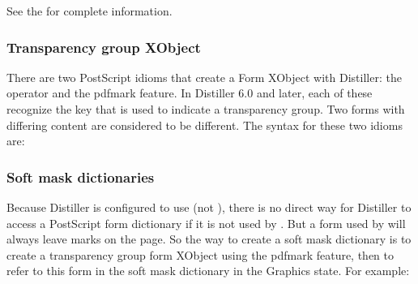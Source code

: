 \documentclass[letterpaper,12pt,english,openany,oneside]{sphinxmanual}
\begin{document}

See the  for complete information.


\subsubsection{Transparency group XObject}
\label{\detokenize{pdfmark_Basic:transparency-group-xobject}}
There are two PostScript idioms that create a Form XObject with Distiller: the  operator and the  pdfmark feature. In Distiller 6.0 and later, each of these recognize the  key that is used to indicate a transparency group. Two forms with differing  content are considered to be different. The syntax for these two idioms are:

\begin{sphinxVerbatim}[commandchars=\\\{\}]
      
         \PYG{p}{[}   \PYG{p}{]}


  \PYG{p}{[}  
         \PYG{p}{[}   \PYG{p}{]}

         
\end{sphinxVerbatim}


\subsubsection{Soft mask dictionaries}
\label{\detokenize{pdfmark_Basic:soft-mask-dictionaries}}
Because Distiller is configured to use  (not  ), there is no direct way for Distiller to access a PostScript form dictionary if it is not used by  . But a form used by  will always leave marks on the page. So the way to create a soft mask dictionary is to create a transparency group form XObject using the  pdfmark feature, then to refer to this form in the soft mask dictionary in the Graphics state. For example:
\end{document}
